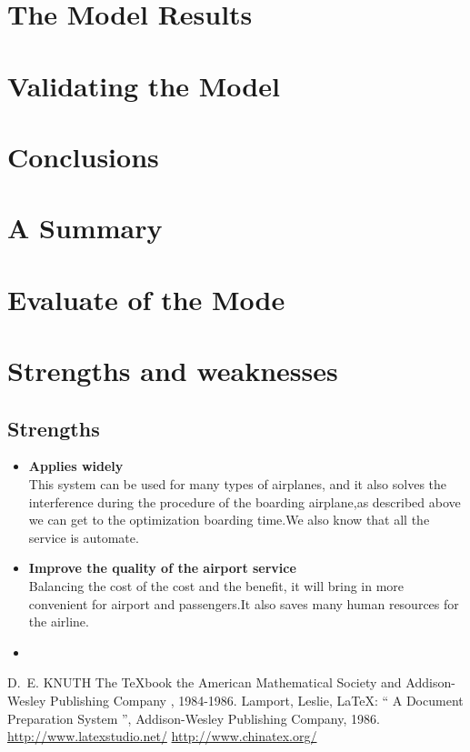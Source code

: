 \documentclass{mcmthesis}
\begin{document}
\section{The Model Results}
\lipsum[6]

\section{Validating the Model}
\lipsum[9]

\section{Conclusions}
\lipsum[6]

\section{A Summary}
\lipsum[6]

\section{Evaluate of the Mode}

\section{Strengths and weaknesses}
\lipsum[12]

\subsection{Strengths}%
\begin{itemize}
\item \textbf{Applies widely}\\
This  system can be used for many types of airplanes, and it also solves the interference during  the procedure of the boarding
airplane,as described above we can get to the  optimization
boarding time.We also know that all the service is automate.
\item \textbf{Improve the quality of the airport service}\\
Balancing the cost of the cost and the benefit, it will bring in
more convenient  for airport and passengers.It also saves many
human resources for the airline. \item \textbf{}
\end{itemize}

\begin{thebibliography}{99}%
 D.~E. KNUTH   The \TeX{}book  the American
Mathematical Society and Addison-Wesley
Publishing Company , 1984-1986.
Lamport, Leslie,  \LaTeX{}: `` A Document Preparation System '',
Addison-Wesley Publishing Company, 1986.
\url{http://www.latexstudio.net/}
\url{http://www.chinatex.org/}
\end{thebibliography}
\end{document}
